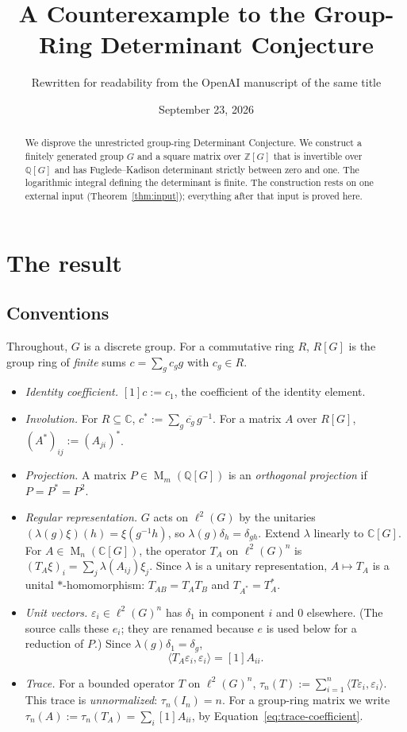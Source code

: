 \documentclass[11pt]{article}
\title{A Counterexample to the Group-Ring Determinant Conjecture}
\author{Rewritten for readability from the OpenAI manuscript of the same title}
\date{September 23, 2026}
\theoremstyle{remark}
\numberwithin{equation}{section}
\newcommand{\Z}{\mathbb Z}
\newcommand{\Q}{\mathbb Q}
\newcommand{\C}{\mathbb C}
\newcommand{\Mat}{\operatorname{M}}
\begin{document}
\maketitle

\begin{abstract}
We disprove the unrestricted group-ring Determinant Conjecture. We construct a finitely generated group $G$ and a square matrix over $\Z[G]$ that is invertible over $\Q[G]$ and has Fuglede--Kadison determinant strictly between zero and one. The logarithmic integral defining the determinant is finite. The construction rests on one external input (Theorem~\ref{thm:input}); everything after that input is proved here.
\end{abstract}

\section{The result}
\label{sec:result}

\subsection{Conventions}

Throughout, $G$ is a discrete group. For a commutative ring $R$, $R[G]$ is the group ring of \emph{finite} sums $c=\sum_g c_g g$ with $c_g\in R$.

\begin{itemize}[leftmargin=2em]
\item \emph{Identity coefficient.} $[1]c:=c_1$, the coefficient of the identity element.
\item \emph{Involution.} For $R\subseteq\C$, $c^*:=\sum_g\overline{c_g}\,g^{-1}$. For a matrix $A$ over $R[G]$, $(A^*)_{ij}:=(A_{ji})^*$.
\item \emph{Projection.} A matrix $P\in\Mat_m(\Q[G])$ is an \emph{orthogonal projection} if $P=P^*=P^2$.
\item \emph{Regular representation.} $G$ acts on $\ell^2(G)$ by the unitaries $(\lambda(g)\xi)(h)=\xi(g^{-1}h)$, so $\lambda(g)\delta_h=\delta_{gh}$. Extend $\lambda$ linearly to $\C[G]$. For $A\in\Mat_n(\C[G])$, the operator $T_A$ on $\ell^2(G)^n$ is $(T_A\xi)_i=\sum_j\lambda(A_{ij})\xi_j$. Since $\lambda$ is a unitary representation, $A\mapsto T_A$ is a unital $*$-homomorphism: $T_{AB}=T_AT_B$ and $T_{A^*}=T_A^*$.
\item \emph{Unit vectors.} $\varepsilon_i\in\ell^2(G)^n$ has $\delta_1$ in component $i$ and $0$ elsewhere. (The source calls these $e_i$; they are renamed because $e$ is used below for a reduction of $P$.) Since $\lambda(g)\delta_1=\delta_g$,
\begin{equation}\label{eq:trace-coefficient}
 \langle T_A\varepsilon_i,\varepsilon_i\rangle=[1]A_{ii}.
\end{equation}
\item \emph{Trace.} For a bounded operator $T$ on $\ell^2(G)^n$, $\tau_n(T):=\sum_{i=1}^n\langle T\varepsilon_i,\varepsilon_i\rangle$. This trace is \emph{unnormalized}: $\tau_n(I_n)=n$. For a group-ring matrix we write $\tau_n(A):=\tau_n(T_A)=\sum_i[1]A_{ii}$, by Equation~\eqref{eq:trace-coefficient}.
\end{itemize}
\end{document}
